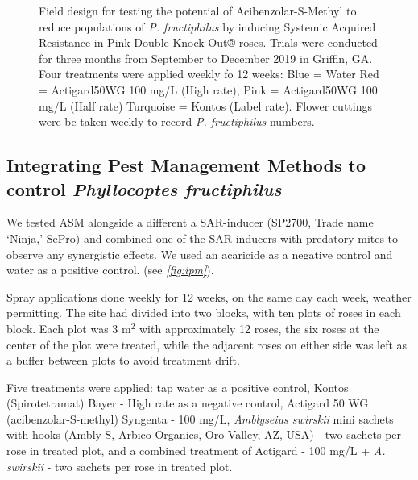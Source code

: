\documentclass[12pt,final,CPage]{ufthesis}
\begin{document}
{\begin{figure}
{  }

  \caption{Field design for testing the potential of Acibenzolar-S-Methyl to reduce populations of \textit{P. fructiphilus} by inducing Systemic Acquired Resistance in Pink Double Knock Out® roses. Trials were conducted for three months from September to December 2019 in Griffin, GA. Four treatments were applied weekly fo 12 weeks: Blue = Water Red = Actigard50WG 100 \si{\milli\gram}/L (High rate),  Pink = Actigard50WG 100 \si{\milli\gram}/L (Half rate) Turquoise = Kontos (Label rate). Flower cuttings were be taken weekly to record \textit{P. fructiphilus} numbers.}\label{fig:unnamed-chunk-2}
  \end{figure}
  \hypertarget{ipm-trials}{%
  \subsection{\texorpdfstring{Integrating Pest Management Methods to control \emph{Phyllocoptes fructiphilus}}{Integrating Pest Management Methods to control Phyllocoptes fructiphilus}}\label{ipm-trials}}

  We tested ASM alongside a different a SAR-inducer (SP2700, Trade name `Ninja,' SePro) and combined one of the SAR-inducers with predatory mites to observe any synergistic effects. We used an acaricide as a negative control and water as a positive control. (see \emph{\ref{fig:ipm}}).

  Spray applications done weekly for 12 weeks, on the same day each week, weather permitting.
  The site had divided into two blocks, with ten plots of roses in each block. Each plot was 3 \si{m}\(^2\) with approximately 12 roses, the six roses at the center of the plot were treated, while the adjacent roses on either side was left as a buffer between plots to avoid treatment drift.

  Five treatments were applied: tap water as a positive control, Kontos (Spirotetramat) Bayer - High rate as a negative control, Actigard 50 WG (acibenzolar-S-methyl) Syngenta - 100 \si{\milli\gram}/\si{\liter}, \emph{Amblyseius swirskii} mini sachets with hooks (Ambly-S, Arbico Organics, Oro Valley, AZ, USA) - two sachets per rose in treated plot, and a combined treatment of Actigard - 100 \si{\milli\gram}/\si{\liter} + \emph{A. swirskii} - two sachets per rose in treated plot.

}
\end{document}
